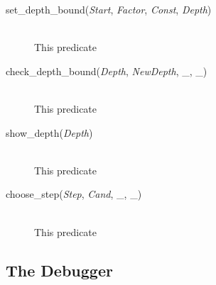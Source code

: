\begin{description}
  \item [set\_depth\_bound({\em Start}, {\em Factor}, {\em Const}, {\em
  Depth})]\ \\
  This predicate 

  \item [check\_depth\_bound({\em Depth}, {\em NewDepth}, \_,
  \_)]\ \\
  This predicate 

  \item [show\_depth({\em Depth})]\ \\
  This predicate 

  \item [choose\_step({\em Step}, {\em Cand}, \_, \_)]\ \\
  This predicate 
\end{description}


\subsection{The Debugger}\label{sec:debugger}



